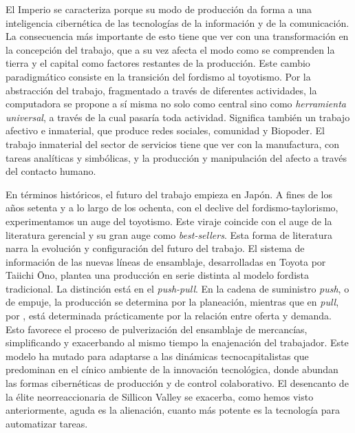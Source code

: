 El Imperio se caracteriza porque su modo de producción da forma a una inteligencia cibernética de las tecnologías de la información y de la comunicación. La consecuencia más importante de esto tiene que ver con una transformación en la concepción del trabajo, que a su vez afecta el modo como se comprenden la tierra y el capital como factores restantes de la producción. Este cambio paradigmático consiste en la transición del fordismo al toyotismo. Por la abstracción del trabajo, fragmentado a través de diferentes actividades, la computadora se propone a sí misma no solo como central sino como \emph{herramienta universal}, a través de la cual pasaría toda actividad. Significa también un trabajo afectivo e inmaterial, que produce redes sociales, comunidad y Biopoder. El trabajo inmaterial del sector de servicios tiene que ver con la manufactura, con tareas analíticas y simbólicas, y la producción y manipulación del afecto a través del contacto humano.

En términos históricos, el futuro del trabajo empieza en Japón. A fines de los años setenta y a lo largo de los ochenta, con el declive del fordismo-taylorismo, experimentamos un auge del toyotismo. Este viraje coincide con el auge de la literatura gerencial y su gran auge como \emph{best-sellers}. Esta forma de literatura narra la evolución y configuración del futuro del trabajo. El sistema de información de las nuevas líneas de ensamblaje, desarrolladas en Toyota por Taiichi \={O}no, plantea una producción en serie distinta al modelo fordista tradicional. La distinción está en el \emph{push-pull}. En la cadena de suministro \emph{push}, o de empuje, la producción se determina por la planeación, mientras que en \emph{pull}, por , está determinada prácticamente por la relación entre oferta y demanda. Esto favorece el proceso de pulverización del ensamblaje de mercancías, simplificando y exacerbando al mismo tiempo la enajenación del trabajador. Este modelo ha mutado para adaptarse a las dinámicas tecnocapitalistas que predominan en el cínico ambiente de la innovación tecnológica, donde abundan las formas cibernéticas de producción y de control colaborativo. El desencanto de la élite neorreaccionaria de Sillicon Valley se exacerba, como hemos visto anteriormente,  aguda es la alienación, cuanto más potente es la tecnología para automatizar tareas.

